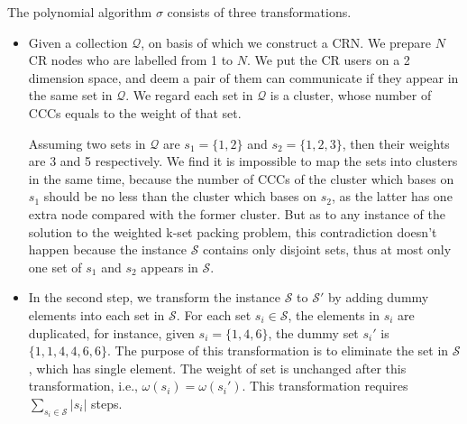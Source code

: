 \documentclass[10pt,journal,compsoc]{IEEEtran}
\makeatletter
\theoremstyle{mytheoremstyle}
\theoremstyle{mytheoremstyle}
\theoremstyle{mytheoremstyle}
\renewenvironment{proof}[1][\proofname]{%
      \par\pushQED{\qed}\fontfamily{ptm}\selectfont%
      \topsep6\p@\@plus6\p@\relax
      \trivlist\item[\hskip\labelsep\bfseries#1\@addpunct{.}]%
      \ignorespaces
    }{%
      \popQED\endtrivlist\@endpefalse
    }
\newcommand{\ie}{i.e., }
\makeatother
\begin{document}
\begin{proof}
The polynomial algorithm $\sigma$ consists of three transformations.

\begin{itemize}
\item Given a collection $\mathcal{Q}$, on basis of which we construct a CRN.
We prepare $N$ CR nodes who are labelled from 1 to $N$.
We put the CR users on a 2 dimension space, and deem a pair of them can communicate if they appear in the same set in $\mathcal{Q}$.
We regard each set in $\mathcal{Q}$ is a cluster, whose number of CCCs equals to the weight of that set.


Assuming two sets in $\mathcal{Q}$ are $s_1=\{1,2\}$ and $s_2=\{1,2,3\}$, then their weights are 3 and 5 respectively.
We find it is impossible to map the sets into clusters in the same time, because the number of CCCs of the cluster which bases on $s_1$ should be no less than the cluster which bases on $s_2$, as the latter has one extra node compared with the former cluster.
But as to any instance of the solution to the weighted k-set packing problem, this contradiction doesn't happen because the instance $\mathcal{S}$ contains only disjoint sets, thus at most only one set of $s_1$ and $s_2$ appears in $\mathcal{S}$.%

\item In the second step, we transform the instance $\mathcal{S}$ to $\mathcal{S'}$ by adding dummy elements into each set in $\mathcal{S}$.
For each set $s_i\in \mathcal{S}$, the elements in $s_i$ are duplicated, for instance, given $s_i=\{1, 4, 6\}$, the dummy set $s_i'$ is $\{1,1,4,4,6,6\}$.
The purpose of this transformation is to eliminate the set in $\mathcal{S}$, which has single element.
The weight of set is unchanged after this transformation, \ie $\omega(s_i)=\omega(s_i')$.
This transformation requires $\sum_{s_i \in \mathcal{S}} |s_i|$ steps.


\end{itemize}
\end{proof}
\end{document}
